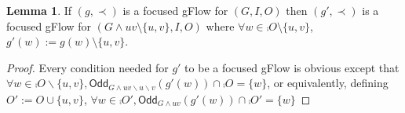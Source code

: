 \documentclass[a4paper,onecolumn,superscriptaddress,11pt,accepted=2020-04-27]{quantumarticle}
\newcommand{\odd}[2]{\textsf{Odd}_{#1}\left(#2\right)}
\theoremstyle{definition}
\newtheorem{lemma}[theorem]{Lemma}
\begin{document}
\begin{lemma} \label{lem:gflow-pivot}
If $(g,\prec)$ is a focused gFlow for $(G,I,O)$ then $(g',\prec)$ is a focused gFlow for ${(G\wedge uv \setminus \{u,v\},I,O)}$ where $\forall w \in \comp O \setminus \{u,v\}$, $g'(w):= g(w) \setminus  \{u,v\}$.%
\end{lemma}

\begin{proof}%
Every condition needed for $g'$ to be a focused gFlow is obvious except that $\forall w\in \comp O\backslash \{u,v\}, \odd {G\wedge uv \backslash u\backslash v} {g'(w)} \cap \comp O = \{w\}$, or equivalently, defining $O':=O\cup \{u,v\}$, $\forall w\in \comp{O'}, \odd {G\wedge uv} {g'(w)} \cap \comp{O'} = \{w\}$  


\end{proof}
\end{document}
